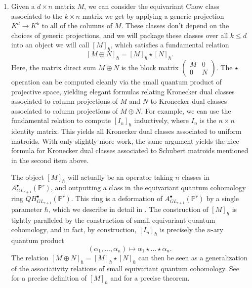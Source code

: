 \documentclass[12pt]{amsart}
\newcommand{\mb}{\mathbb}
\theoremstyle{plain}
\theoremstyle{definition}
\theoremstyle{remark}
\begin{document}
\begin{enumerate}
   Our method naturally yields the equivariant Chow class of $\overline{GL_{r+1}\cdot X}$ as an equivariant version of a sum of integral points of a polytope. Specifically, an application of Brion's theorem \cite{BHS} allows us to encode Li's result via a unique $2n$-variable rational function $f_M(x_1,\ldots,x_n,y_1,\ldots,y_n)$ depending only on $M$ and not on $r$ which has the property that $f_M(z_1,\ldots,z_n,z_1^{r+1},\ldots,z_n^{r+1})$ is a polynomial, and this polynomial specialized to $z_i=H_i$ recovers the non-equivariant class. Denoting by $F(z)=z^{r+1}+c_1z^r+\cdots+c_{r+1}$, we show that $f_M(z_1,\ldots,z_n,F(z_1),\ldots,F(z_n))$ is a polynomial, which when specialized to $z_i=H_i$ recovers the equivariant class. See the beginning of  up to  for a precise formulation.
   \item 
   Given a $d\times n$ matrix $M$, we can consider the equivariant Chow class associated to the $k\times n$ matrix we get by applying a generic projection $K^d\to K^k$ to all of the columns of $M$. These classes don't depend on the choices of generic projections, and we will package these classes over all $k\leq d$ into an object we will call $[M]_{\hbar}$, which satisfies a fundamental relation 
   $$[M\oplus N]_{\hbar}=[M]_{\hbar}\star[N]_{\hbar}.$$
   Here, the matrix direct sum $M\oplus N$ is the block matrix $\begin{pmatrix} M & 0 \\ 0 & N\end{pmatrix}$. The $\star$ operation can be computed cleanly via the small quantum product of projective space, yielding elegant formulas relating Kronecker dual classes associated to column projections of $M$ and $N$ to Kronecker dual classes associated to column projections of $M\oplus N$. For example, we can use the fundamental relation to compute $[I_n]_{\hbar}$ inductively, where $I_n$ is the $n\times n$ identity matrix. This yields all Kronecker dual classes associated to uniform matroids. With only slightly more work, the same argument yields the nice formula for Kronecker dual classes associated to Schubert matroids mentioned in the second item above.
   
   The object $[M]_\hbar$ will actually be an operator taking $n$ classes in $A^\bullet_{GL_{r+1}}(\mb{P}^r)$, and outputting a class in the equivariant quantum cohomology ring $QH^\bullet_{GL_{r+1}}(\mb{P}^r)$. This ring is a deformation of $A^\bullet_{GL_{r+1}}(\mb{P}^r)$ by a single parameter $\hbar$, which we describe in detail in . The construction of $[M]_\hbar$ is tightly paralleled by the construction of small equivariant quantum cohomology, and in fact, by construction, $[I_n]_{\hbar}$ is precisely the $n$-ary quantum product
$$(\alpha_1,\ldots,\alpha_n)\mapsto \alpha_1 \star \ldots \star \alpha_n.$$
The relation $[M\oplus N]_{\hbar}=[M]_{\hbar}\star [N]_{\hbar}$ can then be seen as a generalization of the associativity relations of small equivariant quantum cohomology. See  for a precise definition of $[M]_\hbar$ and  for a precise theorem.
\end{enumerate}
\end{document}
